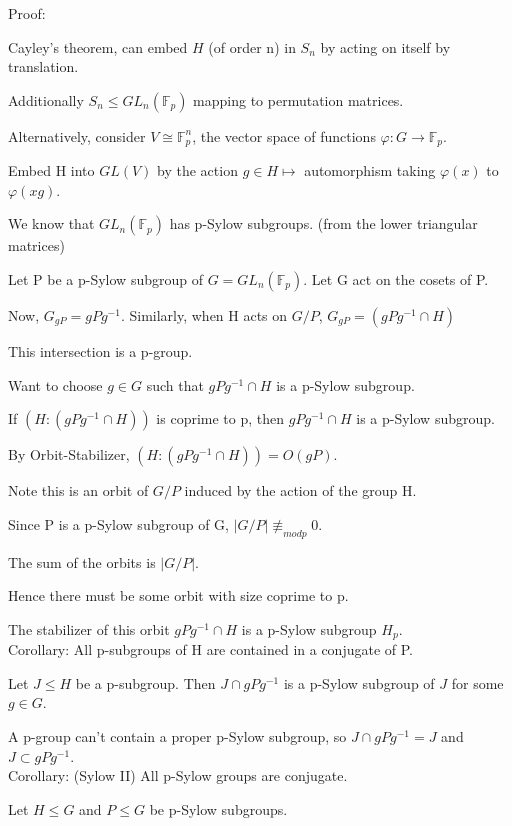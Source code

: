 \documentclass[12pt]{article}
\newcommand{\inv}{^{-1}}
\begin{document}
\noindent
Proof:

Cayley's theorem, can embed $H$ (of order n) in $S_n$ by acting on itself by translation.

Additionally $S_n \leq GL_n(\mathds{F}_p)$ mapping to permutation matrices.

Alternatively, consider $V \cong \mathds{F}_p^n$, the vector space of functions $\varphi : G \to \mathds{F}_p$.

Embed H into $GL(V)$ by the action $g \in H \mapsto$ automorphism taking $\varphi(x)$ to $\varphi(xg)$.

We know that $GL_n(\mathds{F}_p)$ has p-Sylow subgroups.  (from the lower triangular matrices)

Let P be a p-Sylow subgroup of $G = GL_n(\mathds{F}_p)$.  Let G act on the cosets of P.

Now, $G_{gP} = gPg^{-1}$. Similarly, when H acts on $G \slash P$, $G_{gP} = (gPg^{-1} \cap H)$

This intersection is a p-group.

Want to choose $g \in G$ such that $gPg^{-1} \cap H$ is a p-Sylow subgroup.

If $(H : (gPg^{-1} \cap H))$ is coprime to p, then $gPg^{-1} \cap H$ is a p-Sylow subgroup.

By Orbit-Stabilizer, $(H : (gPg^{-1} \cap H)) = O(gP)$.

Note this is an orbit of $G/P$ induced by the action of the group H.

Since P is a p-Sylow subgroup of G, $|G\slash P| \not\equiv_{mod p} 0$.

The sum of the orbits is $|G \slash P|$.

Hence there must be some orbit with size coprime to p.

The stabilizer of this orbit $gPg\inv \cap H$ is a p-Sylow subgroup $H_p$.\\

\noindent
Corollary: All p-subgroups of H are contained in a conjugate of P.

Let $J \leq H$ be a p-subgroup.  Then $J \cap gPg\inv$ is a p-Sylow subgroup of $J$ for some $g \in G$.

A p-group can't contain a proper p-Sylow subgroup, so $J \cap gPg\inv = J$ and $J \subset gPg\inv$.\\

\noindent
Corollary: (Sylow II) All p-Sylow groups are conjugate.

Let $H \leq G$ and $P \leq G$ be p-Sylow subgroups.
\end{document}
